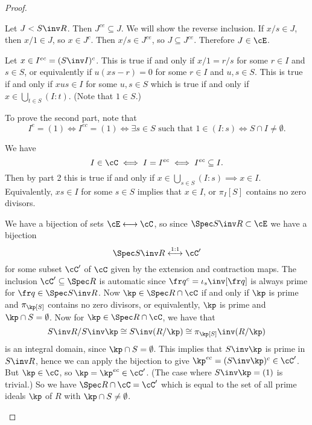 \begin{proof}
  \leavevmode
  \begin{enum}
    \io
    Let $J<S\inv R$.
    Then $J^{ce} \subseteq J$.
    We will show the reverse inclusion.
    If $x/s \in J$, then $x/1 \in J$, so $x \in J^c$.
    Then $x/s \in J^{ce}$, so $J \subseteq J^{ce}$.
    Therefore $J \in \cE$.

    \io
    Let $x \in I^{ec} = (S\inv I)^c$.
    This is true if and only if $x/1=r/s$ for some $r \in I$ and $s \in S$, or equivalently if $u(xs-r)=0$ for some $r \in I$ and $u,s \in S$.
    This is true if and only if $xus \in I$ for some $u,s \in S$ which is true if and only if $x \in \bigcup_{t \in S} (I:t)$.
    (Note that $1 \in S$.)

    To prove the second part, note that
    \[I^e = (1) \iff I^{ec} = (1) \iff \exists s \in S \text{ such that } 1 \in (I:s) \iff S \cap I \neq \emptyset.\]

    \io
    We have
    \[I \in \cC \iff I = I^{ec} \iff I^{ec} \subseteq I.\]
    Then by part 2 this is true if and only if $x \in \bigcup_{s \in S} (I:s) \implies x \in I$.
    Equivalently, $xs \in I$ for some $s \in S$ implies that $x \in I$, or $\pi_I[S]$ contains no zero divisors.

    \io
    We have a bijection of sets $\cE \longleftrightarrow \cC$, so since $\Spec S\inv R \subset \cE$ we have a bijection
    \[\Spec S\inv R \overset{1:1}{\longleftrightarrow} \cC'\]
    for some subset $\cC'$ of $\cC$ given by the extension and contraction maps.
    The inclusion $\cC' \subseteq \Spec R$ is automatic since $\fr q^c = \iota_s\inv[\fr q]$ is always prime for $\fr q \in \Spec S\inv R$.
    Now $\kp \in \Spec R \cap \cC$ if and only if $\kp$ is prime and $\pi_\kp[S]$ contains no zero divisors, or equivalently, $\kp$ is prime and $\kp \cap S = \emptyset$.
    Now for $\kp \in \Spec R \cap \cC$, we have that
    \[S\inv R / S\inv \kp \cong S\inv(R/\kp) \cong \pi_\kp[S]\inv (R/\kp)\]
    is an integral domain, since $\kp \cap S = \emptyset$.
    This implies that $S\inv \kp$ is prime in $S\inv R$, hence we can apply the bijection to give $\kp^{ec} = (S\inv \kp)^c \in \cC'$. 
    But $\kp \in \cC$, so $\kp=\kp^{ec} \in \cC'$.
    (The case where $S\inv\kp=(1)$ is trivial.)
    So we have $\Spec R \cap \cC = \cC'$ which is equal to the set of all prime ideals $\kp$ of $R$ with $\kp \cap S \neq \emptyset$.
    \qedhere
  \end{enum}
\end{proof}
